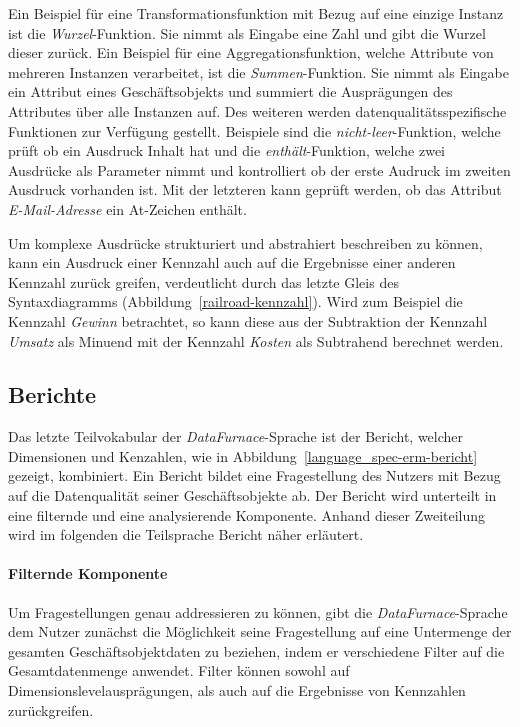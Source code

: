 \documentclass[
  language=german, %
  type=bachelor%
]{isthesis}
\begin{document}
\begin{content}
  Ein  Beispiel für eine Transformationsfunktion mit Bezug auf
  eine einzige Instanz ist die \textit{Wurzel}-Funktion.  Sie nimmt als Eingabe
  eine Zahl und gibt die Wurzel dieser zurück. Ein Beispiel für eine
  Aggregationsfunktion, welche Attribute von mehreren Instanzen verarbeitet,
  ist die \textit{Summen}-Funktion. Sie nimmt als Eingabe ein Attribut eines
  Geschäftsobjekts und summiert die Ausprägungen des Attributes über alle
  Instanzen auf. Des weiteren werden datenqualitätsspezifische Funktionen zur
  Verfügung gestellt. Beispiele sind die \textit{nicht-leer}-Funktion, welche
  prüft ob ein Ausdruck Inhalt hat und die \textit{enthält}-Funktion, welche
  zwei Ausdrücke als Parameter nimmt und kontrolliert ob der erste Audruck im
  zweiten Ausdruck vorhanden ist. Mit der letzteren kann \zB{} geprüft werden,
  ob das Attribut \textit{E-Mail-Adresse} ein At-Zeichen enthält.

  Um komplexe Ausdrücke strukturiert und abstrahiert beschreiben zu können,
  kann ein Ausdruck einer Kennzahl auch auf die Ergebnisse einer anderen
  Kennzahl zurück greifen, verdeutlicht durch das letzte Gleis des
  Syntaxdiagramms (Abbildung~\ref{railroad-kennzahl}). Wird zum Beispiel die
  Kennzahl \textit{Gewinn} betrachtet, so kann diese aus der Subtraktion der
  Kennzahl \textit{Umsatz} als Minuend mit der Kennzahl \textit{Kosten} als
  Subtrahend berechnet werden.


  \subsection{Berichte}

  Das letzte Teilvokabular der \textit{DataFurnace}-Sprache ist der Bericht,
  welcher Dimensionen und Kenzahlen, wie in
  Abbildung~\ref{language_spec-erm-bericht} gezeigt, kombiniert. Ein Bericht
  bildet eine Fragestellung des Nutzers mit Bezug auf die Datenqualität seiner
  Geschäftsobjekte ab. Der Bericht wird unterteilt in eine filternde und eine
  analysierende Komponente. Anhand dieser Zweiteilung wird im folgenden die
  Teilsprache Bericht näher erläutert.

  \begin{figure}[caption={Bericht-Teilsprache}, label={language_spec-erm-bericht}]
    \resizebox{120px}{!}{}
  \end{figure}
  
  \paragraph{Filternde Komponente} Um Fragestellungen genau addressieren zu
  können, gibt die \textit{DataFurnace}-Sprache dem Nutzer zunächst die
  Möglichkeit seine Fragestellung auf eine Untermenge der gesamten
  Geschäftsobjektdaten zu beziehen, indem er verschiedene Filter auf die
  Gesamtdatenmenge anwendet. Filter können sowohl auf
  Dimensionslevelausprägungen, als auch auf die Ergebnisse von Kennzahlen
  zurückgreifen. 
  

\end{content}
\end{document}
